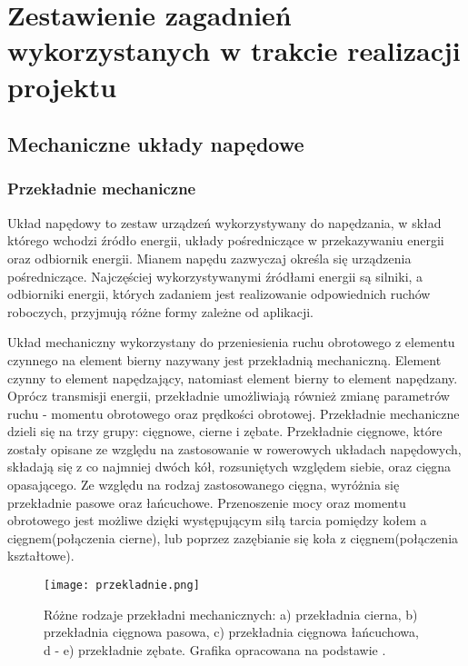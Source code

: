\chapter{Zestawienie zagadnień wykorzystanych w trakcie realizacji projektu}
\label{cha:Zestawienie zagadnień wykorzystanych w pracy}

\section{Mechaniczne układy napędowe}
\subsection{Przekładnie mechaniczne}
Układ napędowy to zestaw urządzeń wykorzystywany do napędzania, w skład którego wchodzi źródło energii, układy pośredniczące w przekazywaniu energii oraz odbiornik energii. Mianem napędu zazwyczaj określa się urządzenia pośredniczące. Najczęściej wykorzystywanymi źródłami energii są silniki, a odbiorniki energii, których zadaniem jest realizowanie odpowiednich ruchów roboczych, przyjmują różne formy zależne od aplikacji.

Układ mechaniczny wykorzystany do przeniesienia ruchu obrotowego z elementu czynnego na element bierny nazywany jest przekładnią mechaniczną. Element czynny to element napędzający, natomiast element bierny to element napędzany. Oprócz transmisji energii, przekładnie umożliwiają również zmianę parametrów ruchu - momentu obrotowego oraz prędkości obrotowej. Przekładnie mechaniczne dzieli się na trzy grupy: cięgnowe, cierne i zębate. Przekładnie cięgnowe, które zostały opisane ze względu na zastosowanie w rowerowych układach napędowych, składają się z co najmniej dwóch kół, rozsuniętych względem siebie, oraz cięgna opasającego. Ze względu na rodzaj zastosowanego cięgna, wyróżnia się przekładnie pasowe oraz łańcuchowe. Przenoszenie mocy oraz momentu obrotowego jest możliwe dzięki występującym siłą tarcia pomiędzy kołem a cięgnem(połączenia cierne), lub poprzez zazębianie się koła z cięgnem(połączenia kształtowe).
\begin{figure}[h]
    \centering
    \texttt{[image: przekladnie.png]}
    \caption{Różne rodzaje przekładni mechanicznych: a) przekładnia cierna, b) przekładnia cięgnowa pasowa, c) przekładnia cięgnowa łańcuchowa, d - e) przekładnie zębate. Grafika opracowana na podstawie \cite{maszyny1}.}
    \label{fig:przekladnia}
\end{figure}

